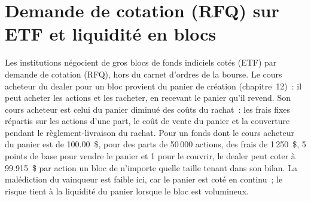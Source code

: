 \begin{omfigure}

\label{fig:hf:bond-and-etf-request-for-quote-market-making:winmodel}
\end{omfigure}

\section{Demande de cotation (RFQ) sur ETF et liquidité en blocs}

Les institutions négocient de gros blocs de fonds indiciels cotés (ETF) par demande de cotation (RFQ), hors du carnet d'ordres de la bourse. Le cours acheteur du dealer pour un bloc provient
du panier de création (chapitre~12)~: il peut acheter les actions et les racheter, en recevant le panier qu'il revend. Son cours acheteur est celui du panier diminué
des coûts du rachat~: les frais fixes répartis sur les actions d'une part, le coût de vente du panier et la couverture pendant le règlement-livraison du rachat. Pour un fonds
dont le cours acheteur du panier est de 100.00~\$, pour des parts de 50\,000 actions, des frais de 1\,250~\$, 5 points de base pour vendre le panier et 1 pour le couvrir, le dealer peut coter
à 99.915~\$ par action un bloc de n'importe quelle taille tenant dans son bilan. La malédiction du vainqueur est faible ici, car le panier est coté en continu~;
le risque tient à la liquidité du panier lorsque le bloc est volumineux.

